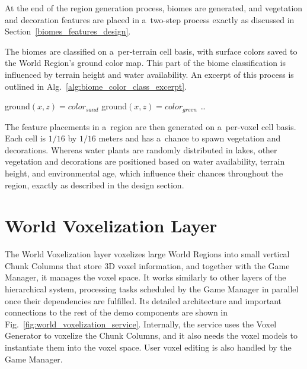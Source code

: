 At the end of the region generation process, biomes are generated, and vegetation and decoration features are placed in a~two-step process exactly as discussed in Section~\ref{biomes_features_design}.

The biomes are classified on a~per-terrain cell basis, with surface colors saved to the World Region's ground color map. This part of the biome classification is influenced by terrain height and water availability. An excerpt of this process is outlined in Alg.~\ref{alg:biome_color_class_excerpt}.

\begin{algorithm}
\caption{Excerpt of biome classification for surface coloring}\label{alg:biome_color_class_excerpt}
\begin{algorithmic}[1]
\State ground$\left(x, z\right) = color_{sand}$
\EndIf
{}
\State ground$\left(x, z\right) = color_{green}$
\EndIf
\State \dots
\EndIf
\EndFor
\EndFor
\end{algorithmic}
\end{algorithm}

The feature placements in a~region are then generated on a~per-voxel cell basis. Each cell is $1/16$ by $1/16$ meters and has a~chance to spawn vegetation and decorations. Whereas water plants are randomly distributed in lakes, other vegetation and decorations are positioned based on water availability, terrain height, and environmental age, which influence their chances throughout the region, exactly as described in the design section.


\section{World Voxelization Layer}\label{voxelization_layer}

The World Voxelization layer voxelizes large World Regions into small vertical Chunk Columns that store 3D voxel information, and together with the Game Manager, it manages the voxel space. It works similarly to other layers of the hierarchical system, processing tasks scheduled by the Game Manager in parallel once their dependencies are fulfilled. Its detailed architecture and important connections to the rest of the demo components are shown in Fig.~\ref{fig:world_voxelization_service}. Internally, the service uses the Voxel Generator to voxelize the Chunk Columns, and it also needs the voxel models to instantiate them into the voxel space. User voxel editing is also handled by the Game Manager.

